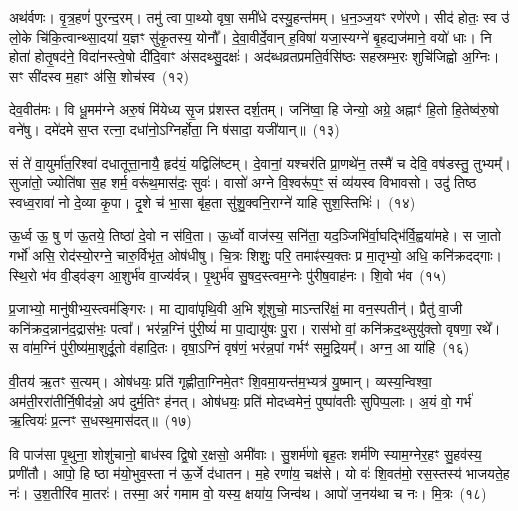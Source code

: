 अथ॑र्वणः। वृ॒त्र॒हणं॑ पुरन्द॒रम्। तमु॑ त्वा पा॒थ्यो वृषा॒ समी॑धे दस्यु॒हन्त॑मम्। ध॒न॒ञ्ज॒यꣳ रणे॑रणे। सीद॑ होतः॒ स्व उ॑ लो॒के चि॑कि॒त्वान्थ्सा॒दया॑ य॒ज्ञꣳ सु॑कृ॒तस्य॒ योनौ᳚। दे॒वा॒वीर्दे॒वान् ह॒विषा॑ यजा॒स्यग्ने॑ बृ॒हद्यज॑माने॒ वयो॑ धाः। नि होता॑ होतृ॒षद॑ने॒ विदा॑नस्त्वे॒षो दी॑दि॒वाꣳ अ॑सदथ्सु॒दक्षः॑। अद॑ब्धव्रतप्रमति॒र्वसि॑ष्ठः सहस्रम्भ॒रः शुचि॑जिह्वो अ॒ग्निः। सꣳ सी॑दस्व म॒हाꣳ अ॑सि॒ शोच॑स्व~(१२)

देव॒वीत॑मः। वि धू॒मम॑ग्ने अरु॒षं मि॑येध्य सृ॒ज प्र॑शस्त दर्\mbox{}श॒तम्। जनि॑ष्वा॒ हि जेन्यो॒ अग्रे॒ अह्नाꣳ॑ हि॒तो हि॒तेष्व॑रु॒षो वने॑षु। दमे॑दमे स॒प्त रत्ना॒ दधा॑नो॒\-ऽग्निर्\mbox{}होता॒ नि ष॑सादा॒ यजी॑यान्॥~(१३)

{\anuvakamend[{स्थ॒ ई॒धे॒ शोच॑स्व स॒प्तविꣳ॑शतिश्च}]}%

सं ते॑ वा॒युर्मा॑त॒रिश्वा॑ दधातूत्ता॒नायै॒ हृद॑यं॒ यद्विलि॑ष्टम्। दे॒वानां॒ यश्चर॑ति प्रा॒णथे॑न॒ तस्मै॑ च देवि॒ वष॑डस्तु॒ तुभ्यम्᳚। सुजा॑तो॒ ज्योति॑षा स॒ह शर्म॒ वरू॑थ॒मास॑दः॒ सुवः॑। वासो॑ अग्ने वि॒श्वरू॑प॒ꣳ॒ सं व्य॑यस्व विभावसो। उदु॑ तिष्ठ स्वध्व॒रावा॑ नो दे॒व्या कृ॒पा। दृ॒शे च॑ भा॒सा बृ॑ह॒ता सु॑शु॒क्वनि॒राग्ने॑ याहि सुश॒स्तिभिः॑।~(१४)

ऊ॒र्ध्व ऊ॒ षु ण॑ ऊ॒तये॒ तिष्ठा॑ दे॒वो न स॑वि॒ता। ऊ॒र्ध्वो वाज॑स्य॒ सनि॑ता॒ यद॒ञ्जिभि॑र्वा॒घद्भि॑र्वि॒ह्वया॑महे। स जा॒तो गर्भो॑ असि॒ रोद॑स्यो॒रग्ने॒ चारु॒र्विभृ॑त॒ ओष॑धीषु। चि॒त्रः शिशुः॒ परि॒ तमाꣴ॑स्य॒क्तः प्र मा॒तृभ्यो॒ अधि॒ कनि॑क्रदद्गाः। स्थि॒रो भ॑व वी॒ड्व॑ङ्ग आ॒शुर्भ॑व वा॒ज्य॑र्वन्न्। पृ॒थुर्भ॑व सु॒षद॒स्त्वम॒ग्नेः पु॑रीष॒वाह॑नः। शि॒वो भ॑व~(१५)

प्र॒जाभ्यो॒ मानु॑षीभ्य॒स्त्वम॑ङ्गिरः। मा द्यावा॑\-पृथि॒वी अ॒भि शू॑शुचो॒ माऽन्तरि॑क्षं॒ मा वन॒स्पतीन्॑। प्रैतु॑ वा॒जी कनि॑क्रद॒न्नान॑द॒द्रास॑भः॒ पत्वा᳚। भर॑न्न॒ग्निं पु॑री॒ष्यं॑ मा पा॒द्यायु॑षः पु॒रा। रास॑भो वां॒ कनि॑क्रद॒थ्सुयु॑क्तो वृषणा॒ रथे᳚। स वा॑म॒ग्निं पु॑री॒ष्य॑मा॒शुर्दू॒तो व॑हादि॒तः। वृषा॒ऽग्निं वृष॑णं॒ भर॑न्न॒पां गर्भꣳ॑ समु॒द्रियम्᳚। अग्न॒ आ या॑हि~(१६)

वी॒तय॑ ऋ॒तꣳ स॒त्यम्। ओष॑धयः॒ प्रति॑ गृह्णीता॒ग्निमे॒तꣳ शि॒वमा॒यन्त॑म॒भ्यत्र॑ यु॒ष्मान्। व्यस्य॒न्विश्वा॒ अम॑ती॒ररा॑तीर्नि॒षीद॑न्नो॒ अप॑ दुर्म॒तिꣳ ह॑नत्। ओष॑धयः॒ प्रति॑ मोदध्वमेनं॒ पुष्पा॑वतीः सुपिप्प॒लाः। अ॒यं वो॒ गर्भ॑ ऋ॒त्वियः॑ प्र॒त्नꣳ स॒धस्थ॒मास॑दत्॥~(१७)

{\anuvakamend[{सु॒श॒स्तिभिः॑ शि॒वो भ॑व याहि॒ षट्त्रिꣳ॑शच्च}]}%

वि पाज॑सा पृ॒थुना॒ शोशु॑चानो॒ बाध॑स्व द्वि॒षो र॒क्षसो॒ अमी॑वाः। सु॒शर्म॑णो बृह॒तः शर्म॑णि स्याम॒ग्नेर॒हꣳ सु॒हव॑स्य॒ प्रणी॑तौ। आपो॒ हि ष्ठा म॑यो॒भुव॒स्ता न॑ ऊ॒र्जे द॑धातन। म॒हे रणा॑य॒ चक्ष॑से। यो वः॑ शि॒वत॑मो॒ रस॒स्तस्य॑ भाजयते॒ह नः॑। उ॒श॒तीरि॑व मा॒तरः॑। तस्मा॒ अरं॑ गमाम वो॒ यस्य॒ क्षया॑य॒ जिन्व॑थ। आपो॑ ज॒नय॑था च नः। मि॒त्रः~(१८)

